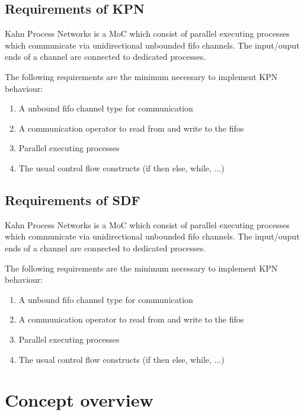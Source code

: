 \subsection{Requirements of KPN}
Kahn Process Networks \cite{kahn:xxx}
is a MoC which consist of parallel executing processes
which communicate via unidirectional unbounded fifo channels.
The input/ouput ends of a channel are connected to dedicated
processes.

The following requirements are the minimum necessary to
implement KPN behaviour:

\begin{enumerate}
\item A unbound fifo channel type for communication
\item A communication operator to read from and write to the fifos
\item Parallel executing processes
\item The usual control flow constructs (if then else, while, ...)
\end{enumerate}

\subsection{Requirements of SDF}
Kahn Process Networks \cite{kahn:xxx}
is a MoC which consist of parallel executing processes
which communicate via unidirectional unbounded fifo channels.
The input/ouput ends of a channel are connected to dedicated
processes.

The following requirements are the minimum necessary to
implement KPN behaviour:

\begin{enumerate}
\item A unbound fifo channel type for communication
\item A communication operator to read from and write to the fifos
\item Parallel executing processes
\item The usual control flow constructs (if then else, while, ...)
\end{enumerate}



\section{Concept overview}

